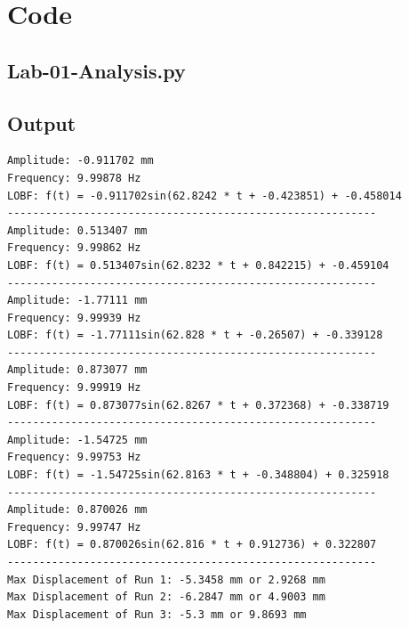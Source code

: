 \documentclass[12 pt]{report}
\begin{document}
\chapter{Code} \label{code}

\section{Lab-01-Analysis.py} \label{lab-01-analysis.py}


\section{Output} \label{output}
\begin{verbatim}
Amplitude: -0.911702 mm
Frequency: 9.99878 Hz
LOBF: f(t) = -0.911702sin(62.8242 * t + -0.423851) + -0.458014
----------------------------------------------------------
Amplitude: 0.513407 mm
Frequency: 9.99862 Hz
LOBF: f(t) = 0.513407sin(62.8232 * t + 0.842215) + -0.459104
----------------------------------------------------------
Amplitude: -1.77111 mm
Frequency: 9.99939 Hz
LOBF: f(t) = -1.77111sin(62.828 * t + -0.26507) + -0.339128
----------------------------------------------------------
Amplitude: 0.873077 mm
Frequency: 9.99919 Hz
LOBF: f(t) = 0.873077sin(62.8267 * t + 0.372368) + -0.338719
----------------------------------------------------------
Amplitude: -1.54725 mm
Frequency: 9.99753 Hz
LOBF: f(t) = -1.54725sin(62.8163 * t + -0.348804) + 0.325918
----------------------------------------------------------
Amplitude: 0.870026 mm
Frequency: 9.99747 Hz
LOBF: f(t) = 0.870026sin(62.816 * t + 0.912736) + 0.322807
----------------------------------------------------------
Max Displacement of Run 1: -5.3458 mm or 2.9268 mm
Max Displacement of Run 2: -6.2847 mm or 4.9003 mm
Max Displacement of Run 3: -5.3 mm or 9.8693 mm
\end{verbatim}
\end{document}
